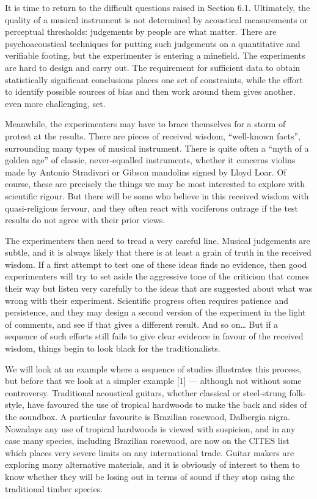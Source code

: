 

  It is time to return to the difficult questions raised in Section 6.1. 
  Ultimately, the quality of a musical instrument is not determined by 
  acoustical measurements or perceptual thresholds: judgements by people are 
  what matter. There are psychoacoustical techniques for putting such 
  judgements on a quantitative and verifiable footing, but the experimenter is 
  entering a minefield. The experiments are hard to design and carry out. The 
  requirement for sufficient data to obtain statistically significant 
  conclusions places one set of constraints, while the effort to identify 
  possible sources of bias and then work around them gives another, even more 
  challenging, set. 

  Meanwhile, the experimenters may have to brace themselves for a storm of 
  protest at the results. There are pieces of received wisdom, “well-known 
  facts”, surrounding many types of musical instrument. There is quite often a 
  “myth of a golden age” of classic, never-equalled instruments, whether it 
  concerns violins made by Antonio Stradivari or Gibson mandolins signed by 
  Lloyd Loar. Of course, these are precisely the things we may be most 
  interested to explore with scientific rigour. But there will be some who 
  believe in this received wisdom with quasi-religious fervour, and they often 
  react with vociferous outrage if the test results do not agree with their 
  prior views. 

  The experimenters then need to tread a very careful line. Musical judgements 
  are subtle, and it is always likely that there is at least a grain of truth 
  in the received wisdom. If a first attempt to test one of these ideas finds 
  no evidence, then good experimenters will try to set aside the aggressive 
  tone of the criticism that comes their way but listen very carefully to the 
  ideas that are suggested about what was wrong with their experiment. 
  Scientific progress often requires patience and persistence, and they may 
  design a second version of the experiment in the light of comments, and see 
  if that gives a different result. And so on… But if a sequence of such 
  efforts still fails to give clear evidence in favour of the received wisdom, 
  things begin to look black for the traditionalists. 

  We will look at an example where a sequence of studies illustrates this 
  process, but before that we look at a simpler example [1] — although not 
  without some controversy. Traditional acoustical guitars, whether classical 
  or steel-strung folk-style, have favoured the use of tropical hardwoods to 
  make the back and sides of the soundbox. A particular favourite is Brazilian 
  rosewood, Dalbergia nigra. Nowadays any use of tropical hardwoods is viewed 
  with suspicion, and in any case many species, including Brazilian rosewood, 
  are now on the CITES list which places very severe limits on any 
  international trade. Guitar makers are exploring many alternative materials, 
  and it is obviously of interest to them to know whether they will be losing 
  out in terms of sound if they stop using the traditional timber species. 


